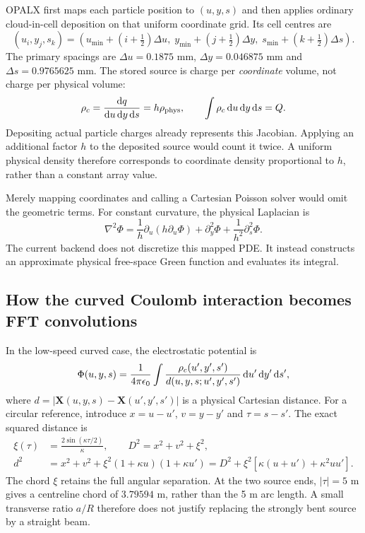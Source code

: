 OPALX first maps each particle position to $(u,y,s)$ and then applies ordinary
cloud-in-cell deposition on that uniform coordinate grid. Its cell centres are
\begin{equation}
 (u_i,y_j,s_k)=
 (u_{\min}+(i+\tfrac12)\Delta u,\;
  y_{\min}+(j+\tfrac12)\Delta y,\;
  s_{\min}+(k+\tfrac12)\Delta s).
 \label{eq:mg-grid}
\end{equation}
The primary spacings are $\Delta u=0.1875$ mm, $\Delta y=0.046875$ mm and
$\Delta s=0.9765625$ mm. The stored source is charge per \emph{coordinate}
volume, not charge per physical volume:
\begin{equation}
 \rho_c=\frac{\mathrm d q}{\mathrm d u\,\mathrm d y\,\mathrm d s}
       =h\rho_{\rm phys},\qquad
 \int\rho_c\,\mathrm d u\,\mathrm d y\,\mathrm d s=Q.
 \label{eq:mg-density}
\end{equation}
Depositing actual particle charges already represents this Jacobian. Applying
an additional factor $h$ to the deposited source would count it twice. A
uniform physical density therefore corresponds to coordinate density
proportional to $h$, rather than a constant array value.

Merely mapping coordinates and calling a Cartesian Poisson solver would omit
the geometric terms. For constant curvature, the physical Laplacian is
\begin{equation}
 \nabla^2\Phi=\frac1h\partial_u(h\partial_u\Phi)
       +\partial_y^2\Phi+\frac1{h^2}\partial_s^2\Phi.
 \label{eq:mg-laplacian}
\end{equation}
The current backend does not discretize this mapped PDE. It instead constructs
an approximate physical free-space Green function and evaluates its integral.

\clearpage
\subsection{How the curved Coulomb interaction becomes FFT convolutions}
In the low-speed curved case, the electrostatic potential is
\begin{equation}
 \Phi(u,y,s)=\frac1{4\pi\epsilon_0}
 \int\frac{\rho_c(u',y',s')}{d(u,y,s;u',y',s')}
           \,\mathrm d u'\,\mathrm d y'\,\mathrm d s',
 \label{eq:mg-exact-potential}
\end{equation}
where $d=|\bm X(u,y,s)-\bm X(u',y',s')|$ is a physical Cartesian distance.
For a circular reference, introduce $x=u-u'$, $v=y-y'$ and $\tau=s-s'$.
The exact squared distance is
\begin{align}
 \xi(\tau)&=\frac{2\sin(\kappa\tau/2)}{\kappa},\qquad
 D^2=x^2+v^2+\xi^2,\nonumber\\
 d^2&=x^2+v^2+\xi^2(1+\kappa u)(1+\kappa u')
     =D^2+\xi^2[\kappa(u+u')+\kappa^2uu'].
 \label{eq:mg-distance}
\end{align}
The chord $\xi$ retains the full angular separation. At the two source ends,
$|\tau|=5$ m gives a centreline chord of $3.79594$ m, rather than the 5 m
arc length. A small transverse ratio $a/R$ therefore does not justify
replacing the strongly bent source by a straight beam.

